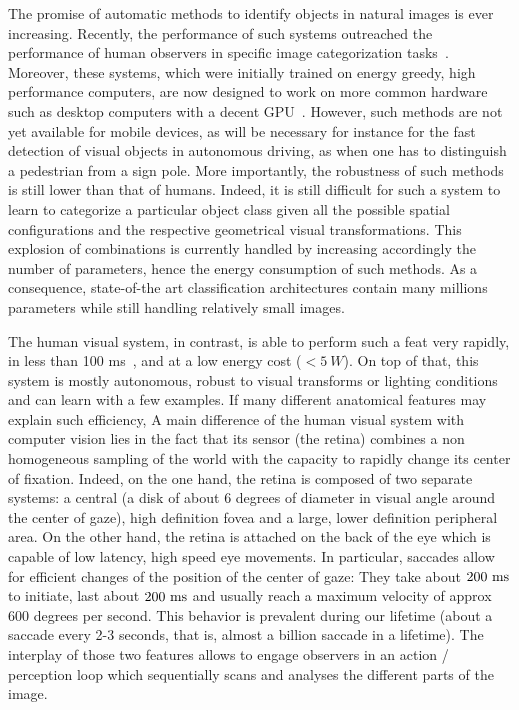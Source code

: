 The promise of automatic methods to identify objects in natural images is ever increasing. Recently, the performance of such systems outreached the performance of human observers in specific image categorization tasks\CNS~\citep{He15}\fi. \CNS Moreover, these systems, which were initially trained on energy greedy, high performance computers, are now designed to work on more common hardware such as desktop computers with a decent GPU~\citep{Sandler18}.
However, such methods are not yet available for mobile devices, as will be necessary for instance for the fast detection of visual objects in autonomous driving, as when one has to distinguish a pedestrian from a sign pole. More importantly, the robustness of such methods is still lower than that of humans. Indeed, it is still difficult for such a system to learn to categorize a particular object class given all the possible spatial configurations and the respective geometrical visual transformations. This explosion of combinations is currently handled by increasing accordingly the number of parameters, hence the energy consumption of such methods. As a consequence, state-of-the art classification architectures contain many millions parameters while still handling relatively small images.

The human visual system, in contrast, is able to perform such a feat very rapidly, in less than 100 ms~\citep{Kirchner06}, and at a low energy cost ($<5~W$). On top of that, this system is mostly autonomous, robust to visual transforms or lighting conditions and can learn with a few examples. If many different anatomical features may explain such efficiency, \fi A main difference of the human visual system with computer vision lies in the fact that its sensor (the retina) combines a non homogeneous sampling of the world with the capacity to rapidly change its center of fixation. Indeed, on the one hand, the retina is composed of two separate systems: a central (a disk of about 6 degrees of diameter in visual angle around the center of gaze), high definition fovea and a large, lower definition peripheral area. On the other hand, the retina is attached on the back of the eye which is capable of low latency, high speed eye movements. \CNS In particular, saccades allow for efficient changes of the position of the center of gaze: They take about $200~\si{\milli\second}$ to initiate, last about $200~\si{\milli\second}$ and usually reach a maximum velocity of approx 600 degrees per second. This behavior is prevalent during our lifetime (about a saccade every 2-3 seconds, that is, almost a billion saccade in a lifetime). \fi The interplay of those two features allows to engage observers in an action / perception loop which sequentially scans and analyses the different parts of the image. 

